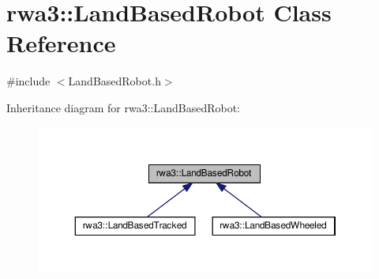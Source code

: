 \hypertarget{classrwa3_1_1_land_based_robot}{}\section{rwa3\+:\+:Land\+Based\+Robot Class Reference}
\label{classrwa3_1_1_land_based_robot}


{\ttfamily \#include $<$Land\+Based\+Robot.\+h$>$}



Inheritance diagram for rwa3\+:\+:Land\+Based\+Robot\+:\nopagebreak
\begin{figure}[H]
\begin{center}
\leavevmode
\includegraphics[width=350pt]{classrwa3_1_1_land_based_robot__inherit__graph}
\end{center}
\end{figure}
